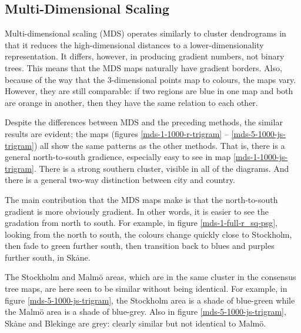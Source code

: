
\subsection{Multi-Dimensional Scaling}

Multi-dimensional scaling (MDS) operates similarly to cluster
dendrograms in that it reduces the high-dimensional distances to a
lower-dimensionality representation. It differs, however, in producing
gradient numbers, not binary trees. This means that the MDS maps
naturally have gradient borders. Also, because of the way that the
3-dimensional points map to colours, the maps vary. However, they are
still comparable: if two regions are blue in one map and both are
orange in another, then they have the same relation to each other.

Despite the differences between MDS and the preceding methods, the
similar results are evident; the maps (figures
\ref{mds-1-1000-r-trigram} -- \ref{mds-5-1000-js-trigram}) all show
the same patterns as the other methods. That is, there is a general
north-to-south gradience, especially easy to see in map
\ref{mds-1-1000-js-trigram}. There is a strong southern cluster,
visible in all of the diagrams. And there is a general two-way
distinction between city and country.

The main contribution that the MDS maps make is that the
north-to-south gradient is more obviously gradient. In other words, it
is easier to see the gradation from north to south. For example, in
figure \ref{mds-1-full-r_sq-psg}, looking from the north to south, the
colours change quickly close to Stockholm, then fade to green further
south, then transition back to blues and purples further south, in
Sk\.ane.

The Stockholm and Malm\"o areas, which are in the same cluster in the
consensus tree maps, are here seen to be similar without being
identical. For example, in figure \ref{mds-5-1000-js-trigram}, the
Stockholm area is a shade of blue-green while the Malm\"o area is a
shade of blue-grey. Also in figure \ref{mds-5-1000-js-trigram},
Sk\.ane and Blekinge are grey: clearly similar but not identical to
Malm\"o.

